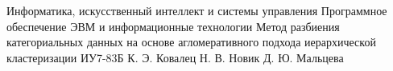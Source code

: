 \makethesistitle
{Информатика, искусственный интеллект и системы управления}
{Программное обеспечение ЭВМ и информационные технологии}
{Метод разбиения категориальных данных на основе агломеративного подхода иерархической кластеризации}
{ИУ7-83Б}
{К. Э. Ковалец}
{Н. В. Новик}
{Д. Ю. Мальцева}
